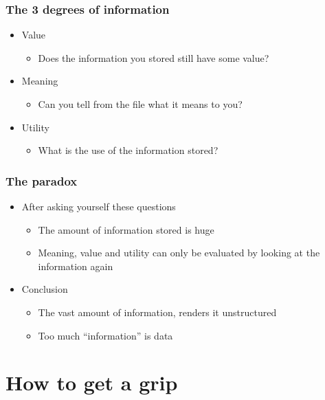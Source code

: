 \documentclass{beamer}
\begin{document}
\begin{frame}
\frametitle{The 3 degrees of information}

\begin{itemize}
  \item Value
  \begin{itemize}
    \item Does the information you stored still have some value?
  \end{itemize}
  \item Meaning
  \begin{itemize}
    \item Can you tell from the file what it means to you?
  \end{itemize}
  \item Utility
  \begin{itemize}
    \item What is the use of the information stored?
  \end{itemize}
\end{itemize}

\end{frame}

\begin{frame}
\frametitle{The paradox}

\begin{itemize}
  \item After asking yourself these questions
  \begin{itemize}
    \item The amount of information stored is huge
    \item Meaning, value and utility can only be evaluated by looking at the
    information again
  \end{itemize}
  \item Conclusion
  \begin{itemize}
    \item The vast amount of information, renders it unstructured
    \item Too much ``information'' is data
  \end{itemize}
  
\end{itemize}

\end{frame}

\section{How to get a grip}
\end{document}
